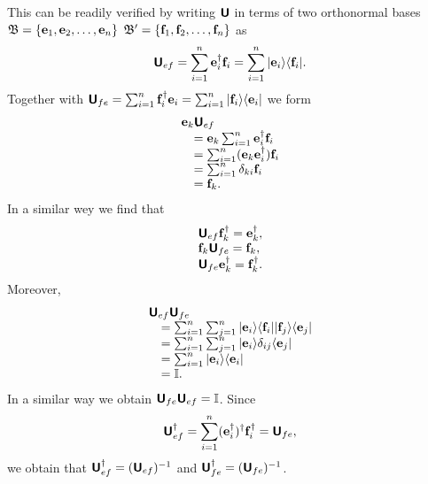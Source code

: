 This can be readily verified \cite{Schwinger.60} by writing $\textsf{\textbf{U}}$
in terms of two orthonormal bases
${\frak B}=\{{\bf e}_1,  {\bf e}_2, \ldots , {\bf e}_n\}$
${\frak B}'=\{{\bf f}_1,  {\bf f}_2, \ldots , {\bf f}_n\}$ as
\begin{equation}
\textsf{\textbf{U}}_{ef}= \sum_{i=1}^n  {\bf e}_i^\dagger {\bf f}_i
=  \sum_{i=1}^n  \vert {\bf e}_i\rangle \langle {\bf f}_i \vert
.
\end{equation}
Together with $\textsf{\textbf{U}}_{fe}= \sum_{i=1}^n  {\bf f}_i^\dagger {\bf e}_i=  \sum_{i=1}^n  \vert {\bf f}_i\rangle \langle {\bf e}_i \vert $
we form
\begin{equation}
\begin{array}{l}
{\bf e}_k \textsf{\textbf{U}}_{ef}\\
\quad = {\bf e}_k\sum_{i=1}^n  {\bf e}_i^\dagger {\bf f}_i \\
\quad
= \sum_{i=1}^n  ({\bf e}_k{\bf e}_i^\dagger) {\bf f}_i \\
\quad
= \sum_{i=1}^n  \delta_{ki} {\bf f}_i \\
\quad  = {\bf f}_k
.
\end{array}
\end{equation}
In a similar wey we find that
\begin{equation}
\begin{array}{l}
\textsf{\textbf{U}}_{ef} {\bf f}_k^\dagger = {\bf e}_k^\dagger,\\
{\bf f}_k\textsf{\textbf{U}}_{fe}   = {\bf f}_k,\\
\textsf{\textbf{U}}_{fe} {\bf e}_k^\dagger = {\bf f}_k^\dagger.
\end{array}
\end{equation}
Moreover,
\begin{equation}
\begin{array}{l}
\textsf{\textbf{U}}_{ef}\textsf{\textbf{U}}_{fe}\\
\quad
=
 \sum_{i=1}^n  \sum_{j=1}^n
\vert {\bf e}_i\rangle \langle {\bf f}_i \vert
\vert {\bf f}_j\rangle \langle {\bf e}_j \vert \\
\quad
=
 \sum_{i=1}^n  \sum_{j=1}^n
\vert {\bf e}_i\rangle \delta_{ij} \langle {\bf e}_j \vert \\
\quad
=
 \sum_{i=1}^n
\vert {\bf e}_i\rangle   \langle {\bf e}_i \vert \\
\quad
=
{\Bbb I}
.
\end{array}
\end{equation}
In a similar way we obtain
$\textsf{\textbf{U}}_{fe}\textsf{\textbf{U}}_{ef}=
{\Bbb I}$.
Since
\begin{equation}
\textsf{\textbf{U}}_{ef}^\dagger = \sum_{i=1}^n ( {\bf e}_i^\dagger)^\dagger {\bf f}_i^\dagger
= \textsf{\textbf{U}}_{fe},
\end{equation}
we obtain that $\textsf{\textbf{U}}_{ef}^\dagger = (\textsf{\textbf{U}}_{ef})^{-1}$
and $\textsf{\textbf{U}}_{fe}^\dagger = (\textsf{\textbf{U}}_{fe})^{-1}$.


